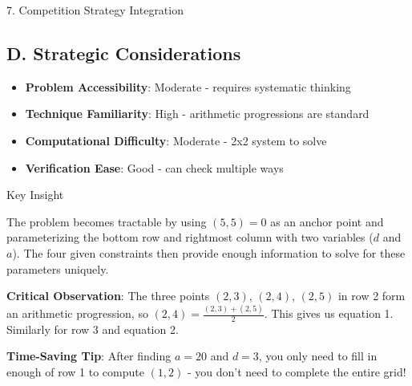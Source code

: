 \documentclass[12pt]{article}
\begin{document}
\begin{competitionbox}{7. Competition Strategy Integration}
\subsection*{D. Strategic Considerations}
\begin{itemize}[leftmargin=*]
    \item \textbf{Problem Accessibility}: Moderate - requires systematic thinking
    \item \textbf{Technique Familiarity}: High - arithmetic progressions are standard
    \item \textbf{Computational Difficulty}: Moderate - 2x2 system to solve
    \item \textbf{Verification Ease}: Good - can check multiple ways
\end{itemize}

\end{competitionbox}

\begin{highlightbox}{Key Insight}

The problem becomes tractable by using $(5,5) = 0$ as an anchor point and parameterizing the bottom row and rightmost column with two variables ($d$ and $a$). The four given constraints then provide enough information to solve for these parameters uniquely.

\vspace{0.5em}
\noindent\textbf{Critical Observation}: The three points $(2,3)$, $(2,4)$, $(2,5)$ in row 2 form an arithmetic progression, so $(2,4) = \frac{(2,3) + (2,5)}{2}$. This gives us equation 1. Similarly for row 3 and equation 2.

\vspace{0.5em}
\noindent\textbf{Time-Saving Tip}: After finding $a = 20$ and $d = 3$, you only need to fill in enough of row 1 to compute $(1,2)$ - you don't need to complete the entire grid!

\end{highlightbox}
\end{document}
